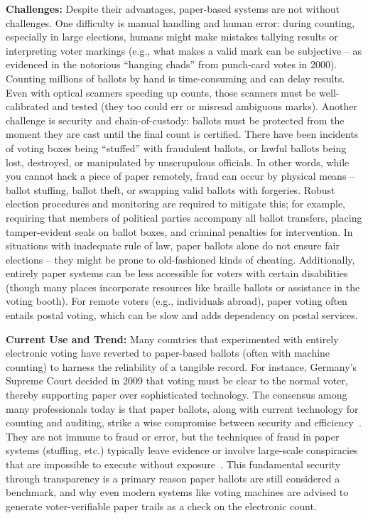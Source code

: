 \documentclass[a4paper,10pt]{report}
\begin{document}
  \textbf  {Challenges:}   Despite their advantages, paper-based systems are not without challenges.   One difficulty is manual handling and human error: during counting, especially in large elections, humans might make mistakes tallying results or interpreting voter markings (e.g., what makes a valid mark can be subjective -- as evidenced in the notorious ``hanging chads'' from punch-card votes in 2000).   Counting millions of ballots by hand is time-consuming and can delay results.   Even with optical scanners speeding up counts, those scanners must be well-calibrated and tested (they too could err or misread ambiguous marks).   Another challenge is security and chain-of-custody: ballots must be protected from the moment they are cast until the final count is certified.   There have been incidents of voting boxes being ``stuffed'' with fraudulent ballots, or lawful ballots being lost, destroyed, or manipulated by unscrupulous officials.   In other words, while you cannot hack a piece of paper remotely, fraud can occur by physical means -- ballot stuffing, ballot theft, or swapping valid ballots with forgeries.   Robust election procedures and monitoring are required to mitigate this; for example, requiring that members of political parties accompany all ballot transfers, placing tamper-evident seals on ballot boxes, and criminal penalties for intervention.   In situations with inadequate rule of law, paper ballots alone do not ensure fair elections -- they might be prone to old-fashioned kinds of cheating.   Additionally, entirely paper systems can be less accessible for voters with certain disabilities (though many places incorporate resources like braille ballots or assistance in the voting booth).   For remote voters (e.g., individuals abroad), paper voting often entails postal voting, which can be slow and adds dependency on postal services.

  \textbf  {Current Use and Trend:}   Many countries that experimented with entirely electronic voting have reverted to paper-based ballots (often with machine counting) to harness the reliability of a tangible record.   For instance, Germany’s Supreme Court decided in 2009 that voting must be clear to the normal voter, thereby supporting paper over sophisticated technology.   The consensus among many professionals today is that paper ballots, along with current technology for counting and auditing, strike a wise compromise between security and efficiency~\cite{brookings2018paper}.   They are not immune to fraud or error, but the techniques of fraud in paper systems (stuffing, etc.) typically leave evidence or involve large-scale conspiracies that are impossible to execute without exposure~\cite{sri2010paper}.   This fundamental security through transparency is a primary reason paper ballots are still considered a benchmark, and why even modern systems like voting machines are advised to generate voter-verifiable paper trails as a check on the electronic count.
\end{document}
